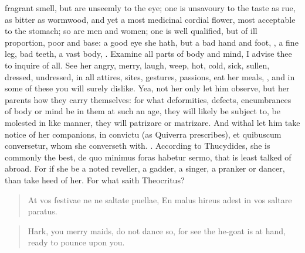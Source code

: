 fragrant smell, but are unseemly to the eye; one is unsavoury to the
taste as rue, as bitter as wormwood, and yet a most medicinal cordial
flower, most acceptable to the stomach; so are men and women; one is
well qualified, but of ill proportion, poor and base: a good eye she
hath, but a bad hand and foot, , a fine leg,
bad teeth, a vast body, \etc{}. Examine all parts of body and mind, I
advise thee to inquire of all. See her angry, merry, laugh, weep, hot,
cold, sick, sullen, dressed, undressed, in all attires, sites,
gestures, passions, eat her meals, \etc{}, and in some of these you will
surely dislike. Yea, not her only let him observe, but her parents how
they carry themselves: for what deformities, defects, encumbrances of
body or mind be in them at such an age, they will likely be subject to,
be molested in like manner, they will patrizare or matrizare. And
withal let him take notice of her companions, in convictu (as Quiverra
prescribes), et quibuscum conversetur, whom she converseth with.
. According to
Thucydides, she is commonly the best, de quo minimus foras habetur
sermo, that is least talked of abroad. For if she be a noted reveller,
a gadder, a singer, a pranker or dancer, than take heed of her. For
what saith Theocritus?

\begin{latin}
\begin{verse}
At vos festivae ne ne saltate puellae,
En malus hireus adest in vos saltare paratus.
\end{verse}
\end{latin}
\translationrule%
\begin{verse}%
Hark, you merry maids, do not dance so,
for see the he-goat is at hand, ready to pounce upon you.
\end{verse}%

